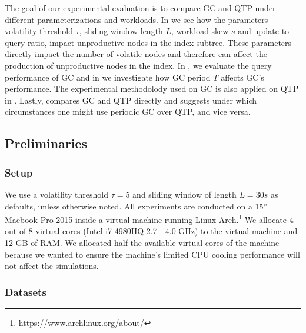 \documentclass[abstracton,12pt]{scrartcl}
\theoremstyle{definition}
\begin{document}
The goal of our experimental evaluation is to compare GC and QTP under
different parameterizations and workloads.
In  we
see how the parameters volatility threshold $\tau$, sliding window length $L$,
workload skew $s$ and update to query ratio, impact unproductive nodes in the
index subtree.
These parameters directly impact the number of volatile nodes and therefore can affect
the production of unproductive nodes in the index.
In , we evaluate the query performance of GC and in
 we investigate how GC period $T$ affects GC's performance.
The experimental methodolody used on GC is also applied on QTP in .
Lastly,  compares GC and QTP directly and suggests under which
circumstances one might use periodic GC over QTP, and vice versa.


\subsection{Preliminaries}

\subsubsection{Setup}

We use a volatility threshold $\tau = 5$ and sliding window of length $L = 30s$ as defaults,
unless otherwise noted.
All experiments are conducted on a 15'' Macbook Pro 2015 inside
a virtual machine running Linux Arch.\footnote{https://www.archlinux.org/about/}
We allocate 4 out of 8 virtual cores (Intel i7-4980HQ 2.7 - 4.0 GHz) to the virtual
machine and 12 GB of RAM. We allocated half the available virtual cores of the machine
because we wanted to ensure the machine's limited CPU cooling performance will not affect the simulations.

\subsubsection{Datasets}
\end{document}
